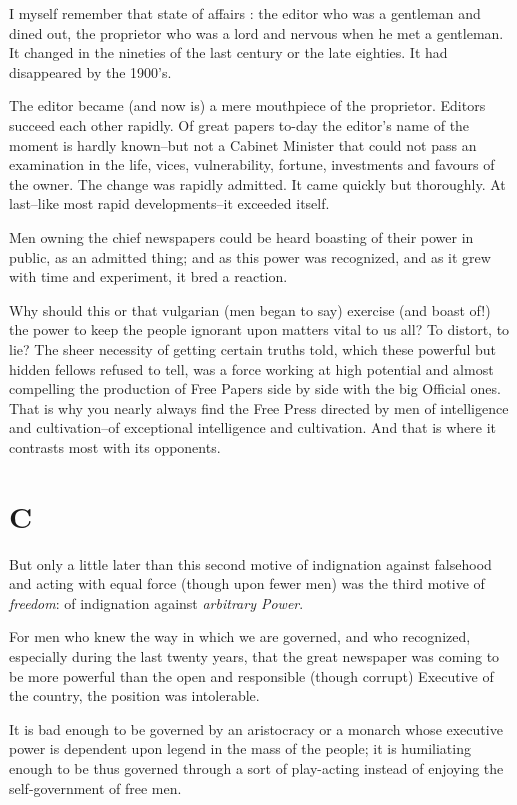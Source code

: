 \documentclass{book}
\begin{document}
I myself remember that state of affairs : the editor who was a gentleman and dined out, the proprietor who was a lord and nervous when he met a gentleman. It changed in the nineties of the last century or the late eighties. It had disappeared by the 1900’s.

The editor became (and now is) a mere mouthpiece of the proprietor. Editors succeed each other rapidly. Of great papers to-day the editor’s name of the moment is hardly known–but not a Cabinet Minister that could not pass an examination in the life, vices, vulnerability, fortune, investments and favours of the owner. The change was rapidly admitted. It came quickly but thoroughly. At last–like most rapid developments–it exceeded itself.

Men owning the chief newspapers could be heard boasting of their power in public, as an admitted thing; and as this power was recognized, and as it grew with time and experiment, it bred a reaction.

Why should this or that vulgarian (men began to say) exercise (and boast of!) the power to keep the people ignorant upon matters vital to us all? To distort, to lie? The sheer necessity of getting certain truths told, which these powerful but hidden fellows refused to tell, was a force working at high potential and almost compelling the production of Free Papers side by side with the big Official ones. That is why you nearly always find the Free Press directed by men of intelligence and cultivation–of exceptional intelligence and cultivation. And that is where it contrasts most with its opponents.

\section*{C}
But only a little later than this second motive of indignation against falsehood and acting with equal force (though upon fewer men) was the third motive of \emph{freedom}: of indignation against \emph{arbitrary Power}.

For men who knew the way in which we are governed, and who recognized, especially during the last twenty years, that the great newspaper was coming to be more powerful than the open and responsible (though corrupt) Executive of the country, the position was intolerable.

It is bad enough to be governed by an aristocracy or a monarch whose executive power is dependent upon legend in the mass of the people; it is humiliating enough to be thus governed through a sort of play-acting instead of enjoying the self-government of free men.
\end{document}
